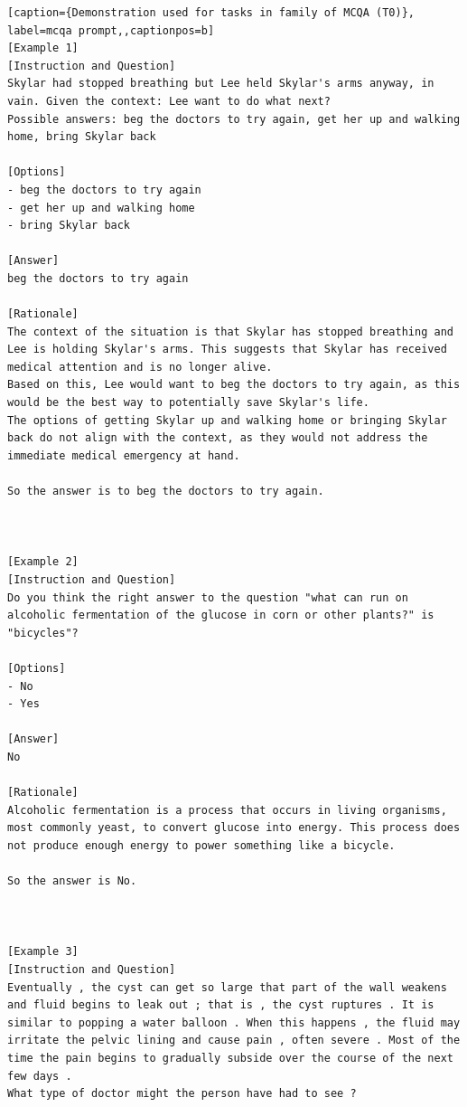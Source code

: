 {}


\begin{lstlisting}[caption={Demonstration used for tasks in family of MCQA (T0)}, label=mcqa prompt,,captionpos=b]
[Example 1]
[Instruction and Question]
Skylar had stopped breathing but Lee held Skylar's arms anyway, in vain. Given the context: Lee want to do what next?
Possible answers: beg the doctors to try again, get her up and walking home, bring Skylar back

[Options]
- beg the doctors to try again
- get her up and walking home
- bring Skylar back

[Answer]
beg the doctors to try again

[Rationale]
The context of the situation is that Skylar has stopped breathing and Lee is holding Skylar's arms. This suggests that Skylar has received medical attention and is no longer alive.
Based on this, Lee would want to beg the doctors to try again, as this would be the best way to potentially save Skylar's life. 
The options of getting Skylar up and walking home or bringing Skylar back do not align with the context, as they would not address the immediate medical emergency at hand.

So the answer is to beg the doctors to try again.



[Example 2]
[Instruction and Question]
Do you think the right answer to the question "what can run on alcoholic fermentation of the glucose in corn or other plants?" is "bicycles"?

[Options]
- No
- Yes

[Answer]
No

[Rationale]
Alcoholic fermentation is a process that occurs in living organisms, most commonly yeast, to convert glucose into energy. This process does not produce enough energy to power something like a bicycle.

So the answer is No.



[Example 3]
[Instruction and Question]
Eventually , the cyst can get so large that part of the wall weakens and fluid begins to leak out ; that is , the cyst ruptures . It is similar to popping a water balloon . When this happens , the fluid may irritate the pelvic lining and cause pain , often severe . Most of the time the pain begins to gradually subside over the course of the next few days .
What type of doctor might the person have had to see ?


\end{lstlisting}
